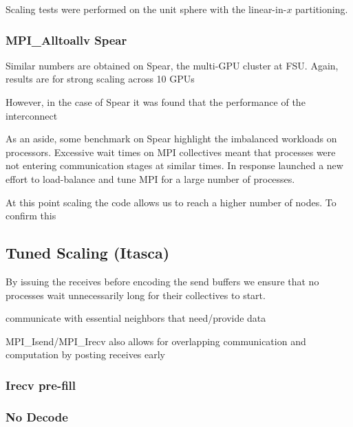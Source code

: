 \documentclass{report}
\begin{document}
Scaling tests were performed on the unit sphere with the linear-in-$x$ partitioning. 



\subsubsection{MPI\_Alltoallv Spear}
Similar numbers are obtained on Spear, the multi-GPU cluster at FSU. Again, results are for strong scaling across 10 GPUs

However, in the case of Spear it was found that the performance of the interconnect


As an aside, some benchmark on Spear highlight the imbalanced workloads on processors. Excessive wait times on MPI collectives meant that processes were not entering communication stages at similar times. In response launched a new effort to load-balance and tune MPI for a large number of processes.

At this point scaling the code allows us to reach a higher number of nodes. To confirm this  


\subsection{Tuned Scaling (Itasca)}




By issuing the receives before encoding the send buffers we ensure that no processes wait unnecessarily long for their collectives to start.



communicate with essential neighbors that need/provide data

MPI\_Isend/MPI\_Irecv also allows for overlapping communication and computation by posting receives early 

\subsubsection{Irecv pre-fill}


\subsubsection{No Decode}

\end{document}
